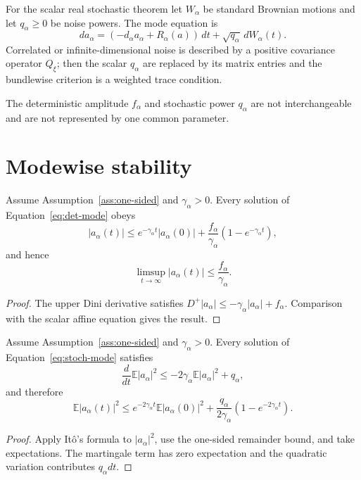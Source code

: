 \documentclass[11pt]{article}
\begin{document}
For the scalar real stochastic theorem let $W_\alpha$ be standard Brownian
motions and let $q_\alpha\ge0$ be noise powers. The mode equation is
\begin{equation}
da_\alpha=(-d_\alpha a_\alpha+R_\alpha(a))\,dt
+\sqrt{q_\alpha}\,dW_\alpha(t).
\label{eq:stoch-mode}
\end{equation}
Correlated or infinite-dimensional noise is described by a positive covariance
operator $Q_\xi$; then the scalar $q_\alpha$ are replaced by its matrix entries
and the bundlewise criterion is a weighted trace condition.

The deterministic amplitude $f_\alpha$ and stochastic power $q_\alpha$ are not
interchangeable and are not represented by one common parameter.

\section{Modewise stability}

\begin{theorem}\label{thm:det-iss}
Assume Assumption~\ref{ass:one-sided} and
$\gamma_\alpha>0$. Every solution of Equation~\eqref{eq:det-mode} obeys
\[
|a_\alpha(t)|
\le e^{-\gamma_\alpha t}|a_\alpha(0)|
+\frac{f_\alpha}{\gamma_\alpha}
(1-e^{-\gamma_\alpha t}),
\]
and hence
\[
\limsup_{t\to\infty}|a_\alpha(t)|
\le\frac{f_\alpha}{\gamma_\alpha}.
\]
\end{theorem}

\begin{proof}
The upper Dini derivative satisfies
$D^+|a_\alpha|\le-\gamma_\alpha|a_\alpha|+f_\alpha$.
Comparison with the scalar affine equation gives the result.
\end{proof}

\begin{theorem}\label{thm:stoch-moment}
Assume Assumption~\ref{ass:one-sided} and
$\gamma_\alpha>0$. Every solution of Equation~\eqref{eq:stoch-mode} satisfies
\[
\frac{d}{dt}\mathbb E|a_\alpha|^2
\le-2\gamma_\alpha\mathbb E|a_\alpha|^2+q_\alpha,
\]
and therefore
\[
\mathbb E|a_\alpha(t)|^2
\le e^{-2\gamma_\alpha t}\mathbb E|a_\alpha(0)|^2
+\frac{q_\alpha}{2\gamma_\alpha}(1-e^{-2\gamma_\alpha t}).
\]
\end{theorem}

\begin{proof}
Apply It\^o's formula to $|a_\alpha|^2$, use the one-sided remainder bound,
and take expectations. The martingale term has zero expectation and the
quadratic variation contributes $q_\alpha dt$.
\end{proof}
\end{document}

